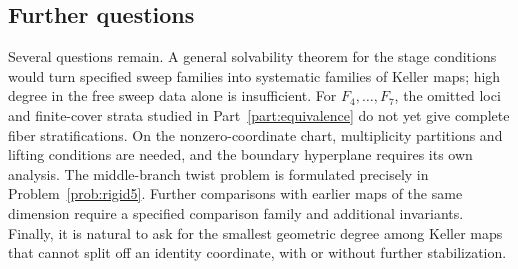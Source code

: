 \documentclass[11pt]{article}
\numberwithin{equation}{section}
\theoremstyle{plain}
\theoremstyle{definition}
\theoremstyle{remark}
\begin{document}
\subsection{Further questions}
Several questions remain. A general solvability theorem for the stage
conditions would turn specified sweep families into systematic families
of Keller maps; high degree in the free sweep data alone is insufficient.
For $F_4,\ldots,F_7$, the omitted loci and finite-cover strata studied in
Part~\ref{part:equivalence} do not yet give complete fiber stratifications.
On the nonzero-coordinate chart, multiplicity partitions and lifting
conditions are needed, and the boundary hyperplane requires its own
analysis. The middle-branch twist problem is formulated precisely in
Problem~\ref{prob:rigid5}. Further comparisons with earlier maps of the
same dimension require a specified comparison family and additional
invariants. Finally, it is natural to ask for the smallest geometric
degree among Keller maps that cannot split off an identity coordinate,
with or without further stabilization.
\end{document}
